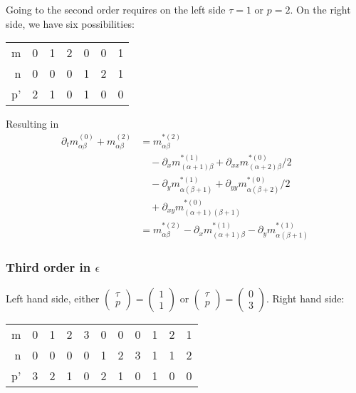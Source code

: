 \documentclass{article}
\begin{document}
Going to the second order requires on the left side $\tau=1$ or $p=2$.
On the right side, we have six possibilities:
\begin{center}
  \begin{tabular} {r || c | *{2}{c} | *{2}{c} | c}
    m  & 0 & 1 & 2 & 0 & 0 & 1 \\
    n  & 0 & 0 & 0 & 1 & 2 & 1 \\
    p' & 2 & 1 & 0 & 1 & 0 & 0
  \end{tabular}
\end{center}
Resulting in
\begin{equation}
  \label{eq:second order in epsilon}
  \begin{aligned}
    \partial_t m_{\alpha\beta}^{(0)} + m_{\alpha\beta}^{(2)}
    & =  m_{\alpha\beta}^{*(2)} \\
    &\quad - \partial_x m_{(\alpha+1)\beta}^{*(1)} + \partial_{xx} m_{(\alpha+2)\beta}^{*(0)}/2 \\
    &\quad - \partial_y m_{\alpha(\beta+1)}^{*(1)} + \partial_{yy} m_{\alpha(\beta+2)}^{*(0)}/2 \\
    &\quad + \partial_{xy} m_{(\alpha+1)(\beta+1)}^{*(0)}\\
    & =  m_{\alpha\beta}^{*(2)} - \partial_x m_{(\alpha+1)\beta}^{*(1)} - \partial_y m_{\alpha(\beta+1)}^{*(1)}
  \end{aligned}
\end{equation}


\subsubsection{Third order in \texorpdfstring{$\epsilon$}{epsilon}}
\label{subs:Third order in epsilon}

Left hand side, either $\begin{pmatrix}\tau \\ p\end{pmatrix} = \begin{pmatrix} 1 \\ 1 \end{pmatrix}$ or $\begin{pmatrix}\tau \\ p\end{pmatrix} = \begin{pmatrix} 0 \\ 3 \end{pmatrix}$.\newline
Right hand side:
\begin{center}
  \begin{tabular} {r || c | *{3}{c} | *{3}{c} | *{3}{c} }
    m  & 0 & 1 & 2 & 3 & 0 & 0 & 0 & 1 & 2 & 1 \\
    n  & 0 & 0 & 0 & 0 & 1 & 2 & 3 & 1 & 1 & 2 \\
    p' & 3 & 2 & 1 & 0 & 2 & 1 & 0 & 1 & 0 & 0
  \end{tabular}
\end{center}
\end{document}

